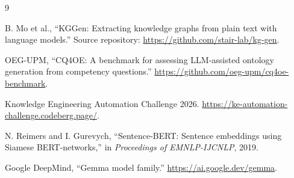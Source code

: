 \documentclass{ceurart}
\begin{document}
\begin{thebibliography}{9}

B. Mo et al., ``KGGen: Extracting knowledge graphs from plain text with
language models.'' Source repository:
\url{https://github.com/stair-lab/kg-gen}.

OEG-UPM, ``CQ4OE: A benchmark for assessing LLM-assisted ontology generation
from competency questions.''
\url{https://github.com/oeg-upm/cq4oe-benchmark}.

Knowledge Engineering Automation Challenge 2026.
\url{https://ke-automation-challenge.codeberg.page/}.

N. Reimers and I. Gurevych, ``Sentence-BERT: Sentence embeddings using Siamese
BERT-networks,'' in \emph{Proceedings of EMNLP-IJCNLP}, 2019.

Google DeepMind, ``Gemma model family.''
\url{https://ai.google.dev/gemma}.

\end{thebibliography}
\end{document}
